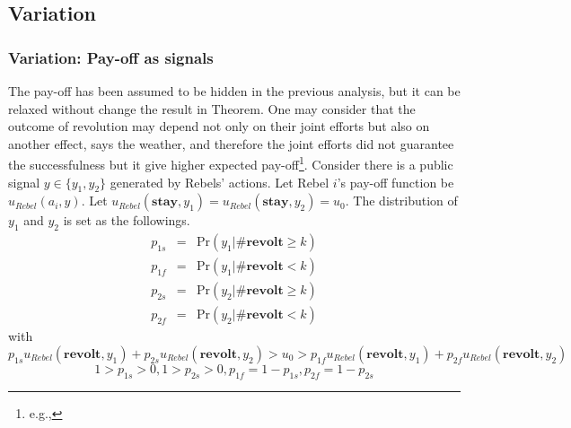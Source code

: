 \documentclass[12pt,letter]{article}
\theoremstyle{definition}
\theoremstyle{remark}
\theoremstyle{claim}
\begin{document}
\subsection{Variation}
\label{sec:varies}


\subsubsection{Variation: Pay-off as signals}
The pay-off has been assumed to be hidden in the previous analysis, but it can be relaxed without change the result in Theorem. One may consider that the outcome of revolution may depend not only on their joint efforts but also on another effect, says the weather, and therefore the joint efforts did not guarantee the successfulness but it give higher expected pay-off\footnote{e.g.,\citep{SHADMEHR2011}}. Consider there is a public signal $y\in \{y_1,y_2\}$ generated by Rebels' actions. Let Rebel $i$'s pay-off function be $u_{Rebel}(a_i,y)$. Let $u_{Rebel}(\textbf{stay},y_1)=u_{Rebel}(\textbf{stay},y_2)=u_0$. The distribution of $y_1$ and $y_2$ is set as the followings.
\begin{eqnarray*}
p_{1s} &=& \mathrm {Pr}(y_1|\#\textbf{revolt}\geq k) \\
p_{1f} &=& \mathrm {Pr}(y_1|\#\textbf{revolt}< k) \\
p_{2s} &=& \mathrm {Pr}(y_2|\#\textbf{revolt}\geq k) \\
p_{2f} &=& \mathrm {Pr}(y_2|\#\textbf{revolt}< k) 
\end{eqnarray*}
with
\begin{equation}
p_{1s}u_{Rebel}(\textbf{revolt}, y_1)+p_{2s}u_{Rebel}(\textbf{revolt}, y_2)>u_0>p_{1f}u_{Rebel}(\textbf{revolt}, y_1)+p_{2f}u_{Rebel}(\textbf{revolt}, y_2)
\end{equation}
\begin{equation}
1>p_{1s}>0,1>p_{2s}>0,p_{1f}=1-p_{1s},p_{2f}=1-p_{2s}
\end{equation}
\end{document}
